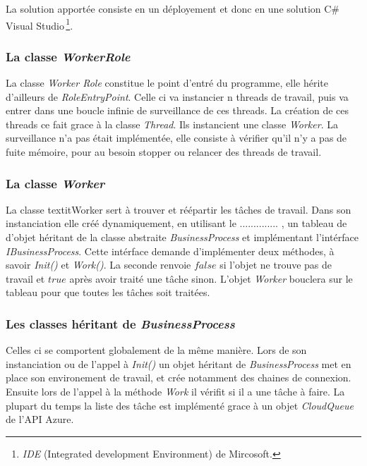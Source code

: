 La solution apportée consiste en un déployement et donc en une
solution C\# Visual Studio\,\footnote{\textit{IDE} (Integrated development
  Environment) de Mircosoft.}.




\subsubsection{La classe \textit{WorkerRole}}
La classe \textit{Worker Role} constitue le point d'entré du
programme, elle hérite d'ailleurs de \textit{RoleEntryPoint}. Celle ci
va instancier n threads de travail, puis va entrer dans une boucle
infinie de surveillance de ces threads. La création de ces threads ce
fait grace à la classe \textit{Thread}. Ils instancient une classe
\textit{Worker}. La surveillance n'a pas était implémentée, elle
consiste à vérifier qu'il n'y a pas de fuite mémoire, pour au besoin
stopper ou relancer des threads de travail. 


\subsubsection{La classe \textit{Worker}}
La classe textit{Worker} sert à trouver et réépartir les tâches de
travail. Dans son instanciation elle créé dynamiquement, en utilisant
le .............. , un tableau de d'objet héritant de la classe
abstraite \textit{BusinessProcess} et implémentant l'intérface
\textit{IBusinessProcess}. Cette intérface demande d'implémenter deux
méthodes, à savoir \textit{Init()} et \textit{Work()}. La seconde
renvoie $false$ si l'objet ne trouve pas de travail et $true$ après
avoir traité une tâche sinon. L'objet \textit{Worker} bouclera sur le
tableau pour que toutes les tâches soit traitées.


\subsubsection{Les classes héritant de \textit{BusinessProcess}}
Celles ci se comportent globalement de la même manière. Lors de son
instanciation ou de l'appel à \textit{Init()} un objet héritant de
\textit{BusinessProcess} met en place son environement de travail, et
crée notamment des chaines de connexion. Ensuite lors de l'appel à la
méthode \textit{Work} il vérifit si il a une tâche à faire. La plupart
du temps la liste des tâche est implémenté grace à un objet
\textit{CloudQueue} de l'API Azure. \\

